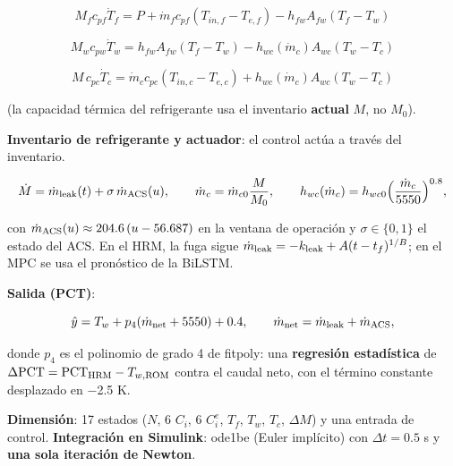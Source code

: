 \documentclass[11pt,a4paper]{article}
\newcommand{\codeus}{\textunderscore\allowbreak}
\newcommand{\code}[1]{{\small\ttfamily\let\_\codeus #1}}
\begin{document}
\[
M_fc_{pf}\dot T_f=P+\dot m_fc_{pf}(T_{in,f}-T_{e,f})-h_{fw}A_{fw}(T_f-T_w)
\]

\[
M_wc_{pw}\dot T_w=h_{fw}A_{fw}(T_f-T_w)-h_{wc}(\dot m_c)A_{wc}(T_w-T_c)
\]

\[
M\,c_{pc}\dot T_c=\dot m_cc_{pc}(T_{in,c}-T_{e,c})+h_{wc}(\dot m_c)A_{wc}(T_w-T_c)
\]

(la capacidad térmica del refrigerante usa el inventario \textbf{actual} $M$, no $M_0$).

\textbf{Inventario de refrigerante y actuador}: el control actúa a través del inventario.

\[
\dot M=\dot m_{\rm leak}(t)+\sigma\,\dot m_{\rm ACS}(u),\qquad
\dot m_c=\dot m_{c0}\frac{M}{M_0},\qquad
h_{wc}(\dot m_c)=h_{wc0}\Big(\frac{\dot m_c}{5550}\Big)^{0.8},
\]

con $\dot m_{\rm ACS}(u)\approx204.6\,(u-56.687)$ en la ventana de operación y $\sigma\in\{0,1\}$ el estado del ACS. En el HRM, la fuga sigue $\dot m_{\rm leak}=-k_{\rm leak}+A(t-t_f)^{1/B}$; en el MPC se usa el pronóstico de la BiLSTM.

\textbf{Salida (PCT)}:

\[
\hat y=T_w+p_4(\dot m_{\rm net}+5550)+0.4,\qquad \dot m_{\rm net}=\dot m_{\rm leak}+\dot m_{\rm ACS},
\]

donde $p_4$ es el polinomio de grado 4 de \code{fit\_poly}: una \textbf{regresión estadística} de $\Delta\mathrm{PCT}=\mathrm{PCT}_{\rm HRM}-T_{w,\rm ROM}$ contra el caudal neto, con el término constante desplazado en $-$2.5 K.

\textbf{Dimensión}: 17 estados ($N$, 6 $C_i$, 6 $C^e_i$, $T_f$, $T_w$, $T_c$, $\Delta M$) y una entrada de control. \textbf{Integración en Simulink}: \code{ode1be} (Euler implícito) con $\Delta t=0.5$ s y \textbf{una sola iteración de Newton}.
\end{document}
